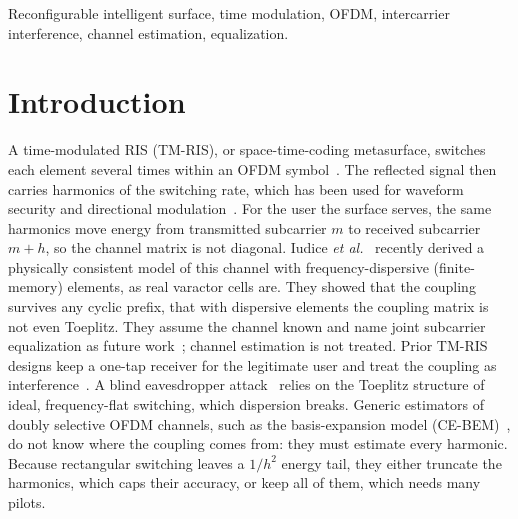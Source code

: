 \documentclass[conference,10pt]{IEEEtran}
\theoremstyle{remark}
\begin{document}
\begin{IEEEkeywords}
Reconfigurable intelligent surface, time modulation, OFDM, intercarrier interference, channel estimation, equalization.
\end{IEEEkeywords}

\section{Introduction}
A time-modulated RIS (TM-RIS), or space-time-coding metasurface, switches each element several times within an OFDM
symbol~\cite{zhang2018}. The reflected signal then carries harmonics of the switching rate, which has been used for
waveform security and directional modulation~\cite{xu2023tmirs,tao2025gflownet}. For the user the surface serves,
the same harmonics move energy from transmitted subcarrier $m$ to received subcarrier $m+h$, so the channel matrix is
not diagonal. Iudice \emph{et al.}~\cite{iudice2026} recently derived a physically consistent model of this channel
with frequency-dispersive (finite-memory) elements, as real varactor cells are. They showed that the coupling survives
any cyclic prefix, that with dispersive elements the coupling matrix is not even Toeplitz. They assume the channel known
and name joint subcarrier equalization as future work~\cite[Sec.~V]{iudice2026}; channel estimation is not treated. Prior TM-RIS designs keep a one-tap receiver for the legitimate user and treat the coupling as
interference~\cite{xu2023tmirs,tao2025gflownet}. A blind eavesdropper attack~\cite{tao2025secure} relies on the
Toeplitz structure of ideal, frequency-flat switching, which dispersion breaks. Generic estimators of doubly selective
OFDM channels, such as the basis-expansion model (CE-BEM)~\cite{tang2007}, do not know where the coupling comes from:
they must estimate every harmonic. Because rectangular switching leaves a $1/h^2$ energy tail, they either truncate the
harmonics, which caps their accuracy, or keep all of them, which needs many pilots.
\end{document}

